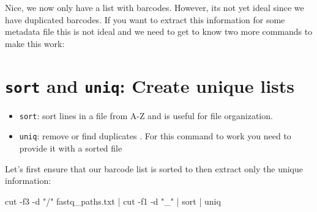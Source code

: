 \documentclass[
  letterpaper,
  DIV=11,
  numbers=noendperiod]{scrreprt}
\newenvironment{Shaded}{}{}
\newcommand{\AttributeTok}[1]{\textcolor[rgb]{0.84,0.23,0.29}{#1}}
\newcommand{\FunctionTok}[1]{\textcolor[rgb]{0.44,0.26,0.76}{#1}}
\newcommand{\KeywordTok}[1]{\textcolor[rgb]{0.84,0.23,0.29}{#1}}
\newcommand{\NormalTok}[1]{\textcolor[rgb]{0.14,0.16,0.18}{#1}}
\newcommand{\StringTok}[1]{\textcolor[rgb]{0.01,0.18,0.38}{#1}}
\providecommand{\tightlist}{%
  \setlength{\itemsep}{0pt}\setlength{\parskip}{0pt}}\usepackage{longtable,booktabs,array}
\begin{document}
Nice, we now only have a list with barcodes. However, its not yet ideal
since we have duplicated barcodes. If you want to extract this
information for some metadata file this is not ideal and we need to get
to know two more commands to make this work:

\section{\texorpdfstring{\texttt{sort} and \texttt{uniq}: Create unique
lists}{sort and uniq: Create unique lists}}\label{sort-and-uniq-create-unique-lists}

\begin{itemize}
\tightlist
\item
  \texttt{sort}: sort lines in a file from A-Z and is useful for file
  organization.
\item
  \texttt{uniq}: remove or find duplicates . For this command to work
  you need to provide it with a sorted file
\end{itemize}

Let's first ensure that our barcode list is sorted to then extract only
the unique information:

\begin{Shaded}
\begin{Highlighting}[]
\FunctionTok{cut} \AttributeTok{{-}f3} \AttributeTok{{-}d} \StringTok{"/"}\NormalTok{ fastq\_paths.txt }\KeywordTok{|} \FunctionTok{cut} \AttributeTok{{-}f1} \AttributeTok{{-}d} \StringTok{"\_"} \KeywordTok{|} \FunctionTok{sort} \KeywordTok{|} \FunctionTok{uniq}
\end{Highlighting}
\end{Shaded}
\end{document}
